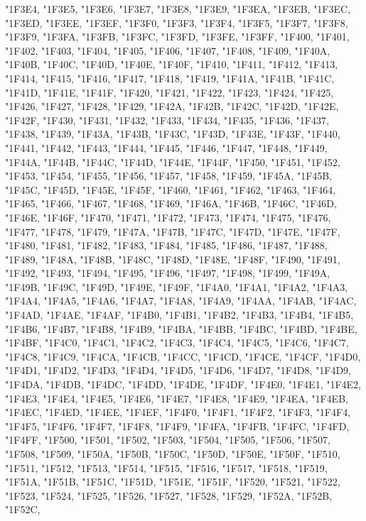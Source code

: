 {"1F3E4,
"1F3E5,
"1F3E6,
"1F3E7,
"1F3E8,
"1F3E9,
"1F3EA,
"1F3EB,
"1F3EC,
"1F3ED,
"1F3EE,
"1F3EF,
"1F3F0,
"1F3F3,
"1F3F4,
"1F3F5,
"1F3F7,
"1F3F8,
"1F3F9,
"1F3FA,
"1F3FB,
"1F3FC,
"1F3FD,
"1F3FE,
"1F3FF,
"1F400,
"1F401,
"1F402,
"1F403,
"1F404,
"1F405,
"1F406,
"1F407,
"1F408,
"1F409,
"1F40A,
"1F40B,
"1F40C,
"1F40D,
"1F40E,
"1F40F,
"1F410,
"1F411,
"1F412,
"1F413,
"1F414,
"1F415,
"1F416,
"1F417,
"1F418,
"1F419,
"1F41A,
"1F41B,
"1F41C,
"1F41D,
"1F41E,
"1F41F,
"1F420,
"1F421,
"1F422,
"1F423,
"1F424,
"1F425,
"1F426,
"1F427,
"1F428,
"1F429,
"1F42A,
"1F42B,
"1F42C,
"1F42D,
"1F42E,
"1F42F,
"1F430,
"1F431,
"1F432,
"1F433,
"1F434,
"1F435,
"1F436,
"1F437,
"1F438,
"1F439,
"1F43A,
"1F43B,
"1F43C,
"1F43D,
"1F43E,
"1F43F,
"1F440,
"1F441,
"1F442,
"1F443,
"1F444,
"1F445,
"1F446,
"1F447,
"1F448,
"1F449,
"1F44A,
"1F44B,
"1F44C,
"1F44D,
"1F44E,
"1F44F,
"1F450,
"1F451,
"1F452,
"1F453,
"1F454,
"1F455,
"1F456,
"1F457,
"1F458,
"1F459,
"1F45A,
"1F45B,
"1F45C,
"1F45D,
"1F45E,
"1F45F,
"1F460,
"1F461,
"1F462,
"1F463,
"1F464,
"1F465,
"1F466,
"1F467,
"1F468,
"1F469,
"1F46A,
"1F46B,
"1F46C,
"1F46D,
"1F46E,
"1F46F,
"1F470,
"1F471,
"1F472,
"1F473,
"1F474,
"1F475,
"1F476,
"1F477,
"1F478,
"1F479,
"1F47A,
"1F47B,
"1F47C,
"1F47D,
"1F47E,
"1F47F,
"1F480,
"1F481,
"1F482,
"1F483,
"1F484,
"1F485,
"1F486,
"1F487,
"1F488,
"1F489,
"1F48A,
"1F48B,
"1F48C,
"1F48D,
"1F48E,
"1F48F,
"1F490,
"1F491,
"1F492,
"1F493,
"1F494,
"1F495,
"1F496,
"1F497,
"1F498,
"1F499,
"1F49A,
"1F49B,
"1F49C,
"1F49D,
"1F49E,
"1F49F,
"1F4A0,
"1F4A1,
"1F4A2,
"1F4A3,
"1F4A4,
"1F4A5,
"1F4A6,
"1F4A7,
"1F4A8,
"1F4A9,
"1F4AA,
"1F4AB,
"1F4AC,
"1F4AD,
"1F4AE,
"1F4AF,
"1F4B0,
"1F4B1,
"1F4B2,
"1F4B3,
"1F4B4,
"1F4B5,
"1F4B6,
"1F4B7,
"1F4B8,
"1F4B9,
"1F4BA,
"1F4BB,
"1F4BC,
"1F4BD,
"1F4BE,
"1F4BF,
"1F4C0,
"1F4C1,
"1F4C2,
"1F4C3,
"1F4C4,
"1F4C5,
"1F4C6,
"1F4C7,
"1F4C8,
"1F4C9,
"1F4CA,
"1F4CB,
"1F4CC,
"1F4CD,
"1F4CE,
"1F4CF,
"1F4D0,
"1F4D1,
"1F4D2,
"1F4D3,
"1F4D4,
"1F4D5,
"1F4D6,
"1F4D7,
"1F4D8,
"1F4D9,
"1F4DA,
"1F4DB,
"1F4DC,
"1F4DD,
"1F4DE,
"1F4DF,
"1F4E0,
"1F4E1,
"1F4E2,
"1F4E3,
"1F4E4,
"1F4E5,
"1F4E6,
"1F4E7,
"1F4E8,
"1F4E9,
"1F4EA,
"1F4EB,
"1F4EC,
"1F4ED,
"1F4EE,
"1F4EF,
"1F4F0,
"1F4F1,
"1F4F2,
"1F4F3,
"1F4F4,
"1F4F5,
"1F4F6,
"1F4F7,
"1F4F8,
"1F4F9,
"1F4FA,
"1F4FB,
"1F4FC,
"1F4FD,
"1F4FF,
"1F500,
"1F501,
"1F502,
"1F503,
"1F504,
"1F505,
"1F506,
"1F507,
"1F508,
"1F509,
"1F50A,
"1F50B,
"1F50C,
"1F50D,
"1F50E,
"1F50F,
"1F510,
"1F511,
"1F512,
"1F513,
"1F514,
"1F515,
"1F516,
"1F517,
"1F518,
"1F519,
"1F51A,
"1F51B,
"1F51C,
"1F51D,
"1F51E,
"1F51F,
"1F520,
"1F521,
"1F522,
"1F523,
"1F524,
"1F525,
"1F526,
"1F527,
"1F528,
"1F529,
"1F52A,
"1F52B,
"1F52C,
}

